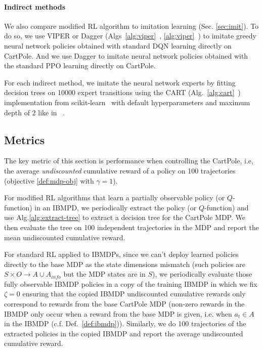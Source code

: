 \paragraph{Indirect methods} We also compare modified RL algorithm to imitation learning (Sec. \ref{sec:imit}).
To do so, we use VIPER or Dagger (Algs~\ref{alg:viper}~\cite{dagger}, \ref{alg:viper}~\cite{viper}) to imitate greedy neural network policies obtained with standard DQN learning directly on CartPole.
And we use Dagger to imitate neural network policies obtained with the standard PPO learning directly on CartPole. 

For each indirect method, we imitate the neural network experts by fitting decision trees on 10000 expert transitions using the CART (Alg.~\ref{alg:cart}~\cite{breiman1984classification}) implementation from scikit-learn~\cite{scikit-learn} with default hyperparameters and maximum depth of 2 like in ~\cite{topin2021iterative}.
    
\subsection{Metrics}
The key metric of this section is performance when controlling the CartPole, i.e, the average \textit{undiscounted} cumulative reward of a policy on 100 trajectories (objective \ref{def:mdp-obj} with $\gamma=1$).

For modified RL algorithms that learn a partially observable policy (or $Q$-function) in an IBMPD, we periodically extract the policy (or $Q$-function) and use Alg.\ref{alg:extract-tree} to extract a decision tree for the CartPole MDP. 
We then evaluate the tree on 100 independent trajectories in the MDP and report the mean undiscounted cumulative reward.

For standard RL applied to IBMDPs, since we can't deploy learned policies directly to the base MDP as the state dimensions mismatch (such policies are $S\times O\rightarrow A \cup A_{info}$ but the MDP states are in $S$), we periodically evaluate those fully observable IBMDP policies in a copy of the training IBMDP in which we fix $\zeta=0$ ensuring that the copied IBMDP undiscounted cumulative rewards only correspond to rewards from the base CartPole MDP (non-zero rewards in the IBMDP only occur when a reward from the base MDP is given, i.e. when $a_t\in A$ in the IBMDP (c.f. Def.~\ref{def:ibmdp})).
Similarly, we do 100 trajectories of the extracted policies in the copied IBMDP and report the average undiscounted cumulative reward.

